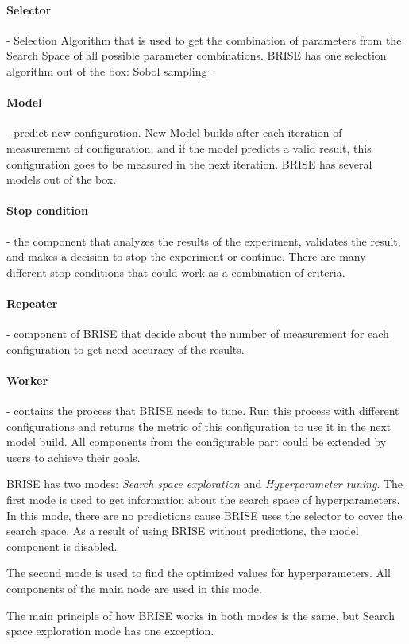 \paragraph{Selector} - Selection Algorithm that is used to get the combination of parameters from the Search Space of all possible parameter combinations. BRISE has one selection algorithm out of the box: Sobol sampling~\cite{sobol99}. 
\paragraph{Model} - predict new configuration. New Model builds after each iteration of measurement of configuration, and if the model predicts a valid result, this configuration goes to be measured in the next iteration. BRISE has several models out of the box.
\paragraph{Stop condition} - the component that analyzes the results of the experiment, validates the result, and makes a decision to stop the experiment or continue. There are many different stop conditions that could work as a combination of criteria.
\paragraph{Repeater} - component of BRISE that decide about the number of measurement for each configuration to get need accuracy of the results. 
\paragraph{Worker} - contains the process that BRISE needs to tune. Run this process with different configurations and returns the metric of this configuration to use it in the next model build.
All components from the configurable part could be extended by users to achieve their goals.

BRISE has two modes: \textit{Search space exploration} and \textit{Hyperparameter tuning}.
The first mode is used to get information about the search space of hyperparameters. In this mode, there are no predictions cause BRISE uses the selector to cover the search space. As a result of using BRISE without predictions, the model component is disabled.

The second mode is used to find the optimized values for hyperparameters. All components of the main node are used in this mode.

The main principle of how BRISE works in both modes is the same, but 
Search space exploration mode has one exception.

